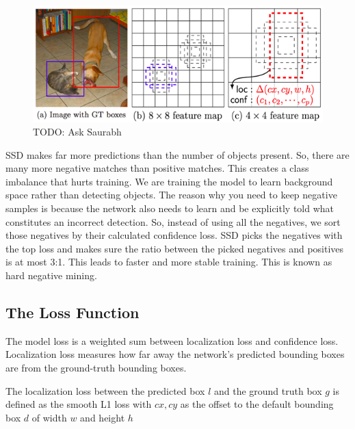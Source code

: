 \documentclass[12pt,letterpaper]{article}
\begin{document}
\begin{figure}[h!]
    \centering
\includegraphics[width = \textwidth,keepaspectratio]{assets/SSDpic.png}
\caption{TODO: Ask Saurabh}
\end{figure}

SSD makes far more predictions than the number of objects present. So, there are many more negative matches than positive matches. This creates a class imbalance that hurts training. We are training the model to learn background space rather than detecting objects. The reason why you need to keep negative samples is because the network also needs to learn and be explicitly told what constitutes an incorrect detection. So, instead of using all the negatives, we sort those negatives by their calculated confidence loss. SSD picks the negatives with the top loss and makes sure the ratio between the picked negatives and positives is at most 3:1. This leads to faster and more stable training. This is known as hard negative mining.

\subsection{The Loss Function}

The model loss is a weighted sum between localization loss and confidence loss. Localization loss measures how far away the network’s predicted bounding boxes are from the ground-truth bounding boxes.

The localization loss between the predicted box $l$ and the ground truth box $g$ is defined as the smooth L1 loss with $cx,cy$ as the offset to the default bounding box $d$ of width $w$ and height $h$
\end{document}
